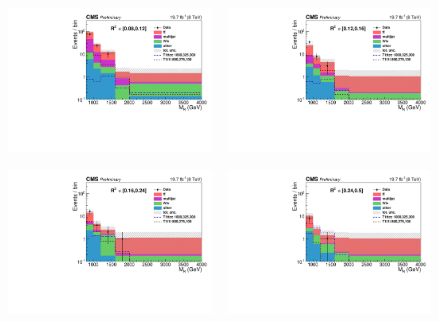 \begin{figure}[htpb]
\centering
\includegraphics[width=0.48\textwidth]{figures/razor_results/bg_prediction_plot_R2bin0}
~
\includegraphics[width=0.48\textwidth]{figures/razor_results/bg_prediction_plot_R2bin1}

\includegraphics[width=0.48\textwidth]{figures/razor_results/bg_prediction_plot_R2bin2}
~
\includegraphics[width=0.48\textwidth]{figures/razor_results/bg_prediction_plot_R2bin3}


\end{figure}
